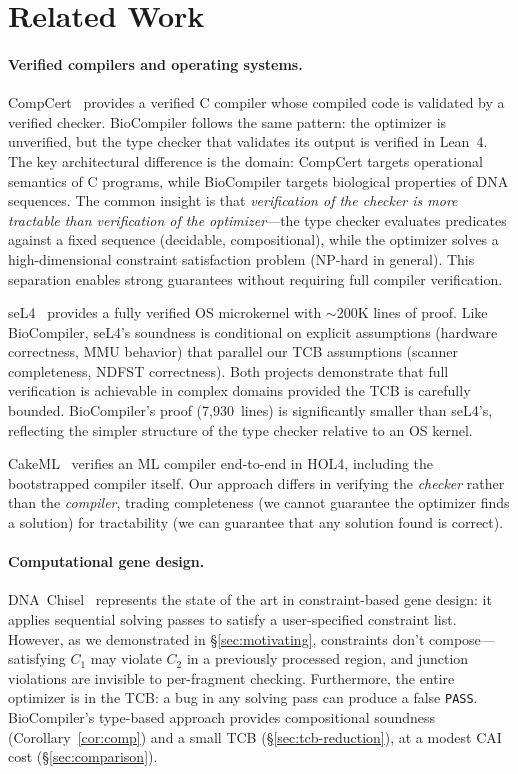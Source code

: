\documentclass[acmsmall,review,anonymous]{acmart}
\begin{document}
\section{Related Work}\label{sec:related}

\paragraph{Verified compilers and operating systems.}
CompCert~\cite{leroy2009compcert} provides a verified C compiler whose
compiled code is validated by a verified checker.  BioCompiler follows
the same pattern: the optimizer is unverified, but the type checker that
validates its output is verified in Lean~4.  The key architectural
difference is the domain: CompCert targets operational semantics of C
programs, while BioCompiler targets biological properties of DNA
sequences.  The common insight is that \emph{verification of the checker
is more tractable than verification of the optimizer}---the type checker
evaluates predicates against a fixed sequence (decidable, compositional),
while the optimizer solves a high-dimensional constraint satisfaction
problem (NP-hard in general).  This separation enables strong guarantees
without requiring full compiler verification.

seL4~\cite{klein2014sel4} provides a fully verified OS microkernel with
$\sim$200K lines of proof.  Like BioCompiler, seL4's soundness is
conditional on explicit assumptions (hardware correctness, MMU behavior)
that parallel our TCB assumptions (scanner completeness, NDFST
correctness).  Both projects demonstrate that full verification is
achievable in complex domains provided the TCB is carefully bounded.
BioCompiler's proof (7,930~lines) is significantly smaller than seL4's,
reflecting the simpler structure of the type checker relative to an OS
kernel.

CakeML~\cite{kumar2014cakeml} verifies an ML compiler end-to-end in
HOL4, including the bootstrapped compiler itself.  Our approach differs
in verifying the \emph{checker} rather than the \emph{compiler}, trading
completeness (we cannot guarantee the optimizer finds a solution) for
tractability (we can guarantee that any solution found is correct).

\paragraph{Computational gene design.}
DNA~Chisel~\cite{piret2020dnachisel} represents the state of the art in
constraint-based gene design: it applies sequential solving passes to
satisfy a user-specified constraint list.  However, as we demonstrated
in \S\ref{sec:motivating}, constraints don't compose---satisfying $C_1$
may violate $C_2$ in a previously processed region, and junction
violations are invisible to per-fragment checking.  Furthermore, the
entire optimizer is in the TCB: a bug in any solving pass can produce a
false \texttt{PASS}.  BioCompiler's type-based approach provides
compositional soundness (Corollary~\ref{cor:comp}) and a small TCB
(\S\ref{sec:tcb-reduction}), at a modest CAI cost (\S\ref{sec:comparison}).
\end{document}
